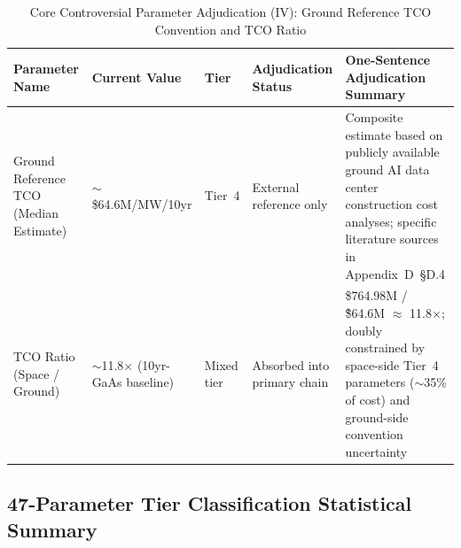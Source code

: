 \begin{table}[H]
  \centering
  \caption{Core Controversial Parameter Adjudication (IV): Ground Reference TCO Convention and TCO Ratio}
  \label{tab:core-verdicts-tco}
  \small
  \begin{tabularx}{\textwidth}{
    >{\raggedright\arraybackslash}p{3.0cm}
    >{\raggedright\arraybackslash}p{2.5cm}
    >{\centering\arraybackslash}p{1.5cm}
    >{\raggedright\arraybackslash}p{2.5cm}
    >{\raggedright\arraybackslash}X
  }
  \toprule
  \textbf{Parameter Name} & \textbf{Current Value} & \textbf{Tier} & \textbf{Adjudication Status} & \textbf{One-Sentence Adjudication Summary} \\
  \midrule
  Ground Reference TCO (Median Estimate) & $\sim$\$64.6M/MW/10yr & Tier~4 & External reference only & Composite estimate based on publicly available ground AI data center construction cost analyses; specific literature sources in Appendix~D~\S D.4 \\
  TCO Ratio (Space / Ground) & $\sim$11.8$\times$ (10yr-GaAs baseline) & Mixed tier & Absorbed into primary chain & \$764.98M / \~\$64.6M $\approx$ 11.8$\times$; doubly constrained by space-side Tier~4 parameters ($\sim$35\% of cost) and ground-side convention uncertainty \\
  \bottomrule
  \end{tabularx}
\end{table}

\subsection{47-Parameter Tier Classification Statistical Summary}

